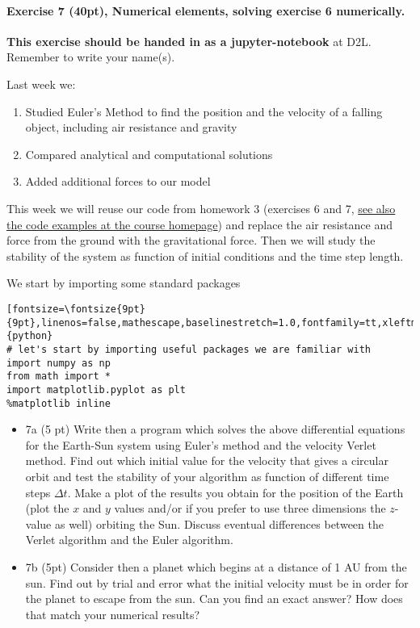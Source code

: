 \documentclass[%
oneside,                 %
final,                   %
10pt]{article}
\begin{document}
\noindent
\paragraph{Exercise 7 (40pt), Numerical elements, solving exercise 6 numerically.}
\textbf{This exercise should be handed in as a jupyter-notebook} at D2L. Remember to write your name(s). 

Last week we:
\begin{enumerate}
\item Studied  Euler's Method to find the position and the velocity of a falling object, including air resistance and gravity

\item Compared analytical and computational solutions 

\item Added additional forces to our model
\end{enumerate}

\noindent
This week we will reuse our code from homework 3 (exercises 6 and 7,
\href{{https://github.com/mhjensen/Physics321/tree/master/doc/src/motion/Programs}}{see also the code examples at the course
homepage})
and replace the air resistance and force from the ground with the
gravitational force. Then we will study the stability of the system as function of initial conditions and the time step length.

We start by importing some standard packages
\begin{verbatim}[fontsize=\fontsize{9pt}{9pt},linenos=false,mathescape,baselinestretch=1.0,fontfamily=tt,xleftmargin=7mm]{python}
# let's start by importing useful packages we are familiar with
import numpy as np
from math import *
import matplotlib.pyplot as plt
%matplotlib inline
\end{verbatim}

\begin{itemize}
\item 7a (5 pt)  Write then a program which solves the above differential equations for the Earth-Sun system using Euler's  method and the velocity Verlet method.  Find out which initial value for the velocity that gives a circular orbit and test the stability of your algorithm as function of different time steps $\Delta t$.  Make a plot of the results you obtain for the position of the Earth (plot the $x$ and $y$ values and/or if you prefer to use three dimensions the $z$-value as well) orbiting  the Sun. Discuss eventual differences between the Verlet algorithm and the Euler algorithm. 

\item 7b (5pt) Consider then a planet which begins at a distance of 1 AU from the sun. Find out by trial and error what the initial velocity must be in order for the planet to escape from the sun.  Can you find an exact answer?  How does that match your numerical results?
\end{itemize}
\end{document}
